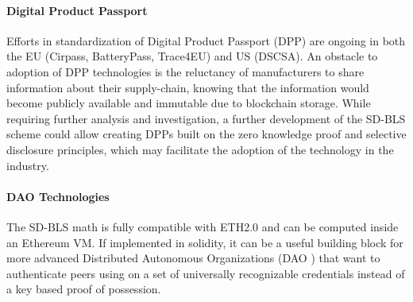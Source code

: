 \documentclass[conference]{IEEEtran}
\begin{document}
\paragraph{Digital Product Passport}
Efforts in standardization of Digital Product Passport (DPP) are ongoing in both the EU (Cirpass, BatteryPass, Trace4EU) and US (DSCSA). An obstacle to adoption of DPP technologies is the reluctancy of manufacturers to share information about their supply-chain, knowing that the information would become publicly available and immutable due to blockchain storage. While requiring further analysis and investigation, a further development of the SD-BLS scheme could allow creating DPPs built on the zero knowledge proof and selective disclosure principles, which may facilitate the adoption of the technology in the industry.

\paragraph{DAO Technologies}
The SD-BLS math is fully compatible with ETH2.0 and can be computed inside an Ethereum VM. If implemented in solidity, it can be a useful building block for more advanced Distributed Autonomous Organizations (DAO \cite{dao}) that want to authenticate peers using on a set of universally recognizable credentials instead of a key based proof of possession.




\end{document}
